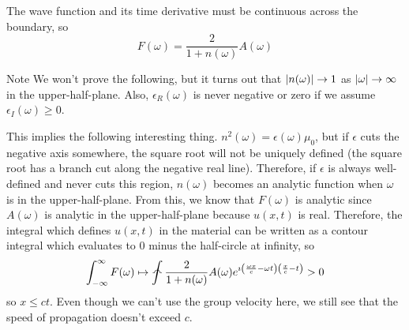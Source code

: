 \documentclass[a4paper,twoside,master.tex]{subfiles}
\begin{document}
The wave function and its time derivative must be continuous across the boundary, so
\begin{equation}
    F(\omega) = \frac{2}{1 + n(\omega)} A(\omega)
\end{equation}

\begin{note}{Note}
    We won't prove the following, but it turns out that $ \abs{n(\omega)} \to 1 $ as $ \abs{\omega} \to \infty $ in the upper-half-plane. Also, $ \epsilon_R(\omega) $ is never negative or zero if we assume $ \epsilon_I(\omega) \geq 0 $.
\end{note}

This implies the following interesting thing. $ n^2(\omega) = \epsilon(\omega) \mu_0 $, but if $ \epsilon $ cuts the negative axis somewhere, the square root will not be uniquely defined (the square root has a branch cut along the negative real line). Therefore, if $ \epsilon $ is always well-defined and never cuts this region, $ n(\omega) $ becomes an analytic function when $ \omega $ is in the upper-half-plane. From this, we know that $ F(\omega) $ is analytic since $ A(\omega) $ is analytic in the upper-half-plane because $ u(x,t) $ is real. Therefore, the integral which defines $ u(x,t) $ in the material can be written as a contour integral which evaluates to $ 0 $ minus the half-circle at infinity, so 
\begin{equation}
    \int_{- \infty}^{\infty} F(\omega) \mapsto \landupint \frac{2}{1 + n(\omega)} A(\omega) e^{\imath \left( \frac{\omega x}{c} - \omega t \right)\left( \frac{x}{c} - t \right)} > 0
\end{equation}
so $ x \leq ct $. Even though we can't use the group velocity here, we still see that the speed of propagation doesn't exceed $ c $.
\end{document}
